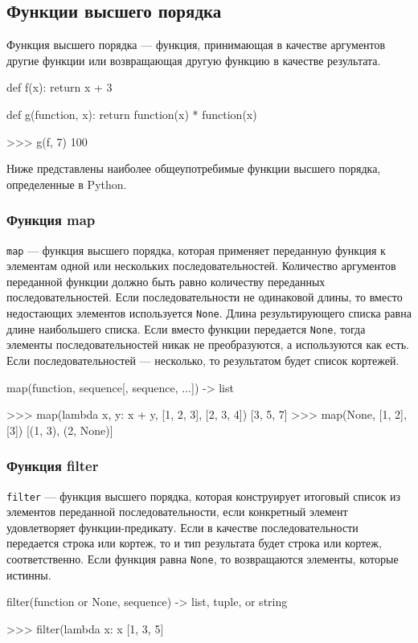 \subsection{Функции высшего порядка}
Функция высшего порядка --- функция, принимающая в качестве аргументов другие функции или возвращающая другую функцию в качестве результата.
\begin{pylst}{}{}
def f(x):
    return x + 3
 
def g(function, x):
    return function(x) * function(x)
 
>>> g(f, 7)
100
\end{pylst}

Ниже представлены наиболее общеупотребимые функции высшего порядка, определенные в Python.

\subsubsection{Функция map}
\lstinline{map} --- функция высшего порядка, которая применяет переданную функция к элементам одной или нескольких последовательностей. Количество аргументов переданной функции должно быть равно количеству переданных последовательностей. Если последовательности не одинаковой длины, то вместо недостающих элементов используется \lstinline{None}. Длина результирующего списка равна длине наибольшего списка. Если вместо функции передается \lstinline{None}, тогда элементы последовательностей никак не преобразуются, а используются как есть. Если последовательностей --- несколько, то результатом будет список кортежей.
\begin{pylst}{}{}
map(function, sequence[, sequence, ...]) -> list

>>> map(lambda x, y: x + y, [1, 2, 3], [2, 3, 4])
[3, 5, 7]
>>> map(None, [1, 2], [3])
[(1, 3), (2, None)]
\end{pylst}

\subsubsection{Функция filter}
\lstinline{filter} --- функция высшего порядка, которая конструирует итоговый список из элементов переданной последовательности, если конкретный элемент удовлетворяет функции-предикату. Если в качестве последовательности передается строка или кортеж, то и тип результата будет строка или кортеж, соответственно. Если функция равна \lstinline{None}, то возвращаются элементы, которые истинны.
\begin{pylst}{}{}
filter(function or None, sequence) -> list, tuple, or string

>>> filter(lambda x: x %
[1, 3, 5]
\end{pylst}

